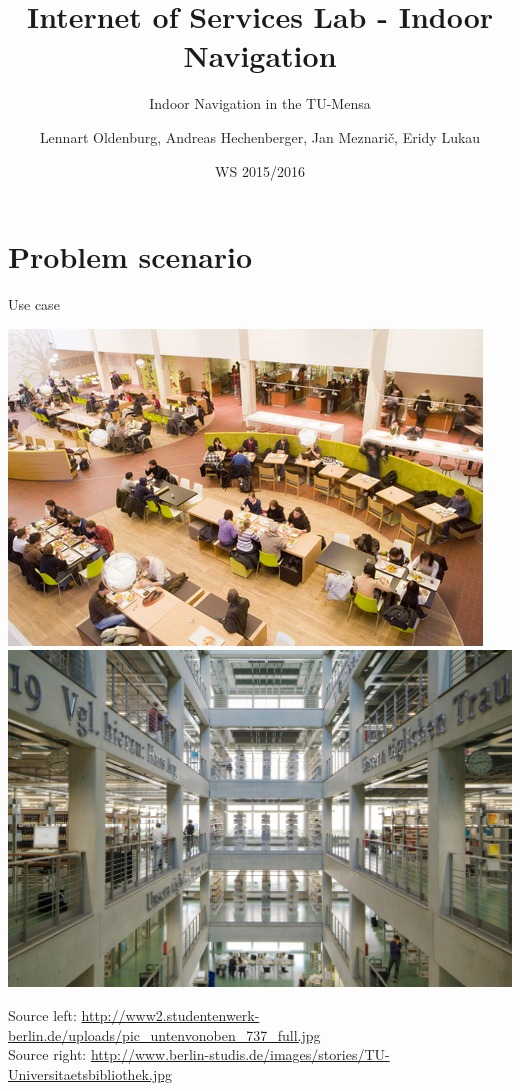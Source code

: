 \documentclass[11pt]{beamer}
\title{Internet of Services Lab - Indoor Navigation}
\subtitle{\small{Indoor Navigation in the TU-Mensa}}
\author[Oldenburg, Hechenberger, Meznarič, Lukau]{{Lennart Oldenburg, Andreas Hechenberger, Jan Meznarič, Eridy Lukau}}
\institute[TU Berlin]{Department of Telecommunication Systems Service-centric Networking
\\ Technische Universität Berlin}
\date[WS 2015/2016]{WS 2015/2016}
\newcounter{currentOutline}
\begin{document}
\begin{frame}[plain]
    \titlepage
\end{frame}





\section{Problem scenario}

\begin{frame}{Use case}

	\vspace{1cm}

    \begin{center}

        \includegraphics[width=.5\textwidth]{mensa}
        \includegraphics[width=.5\textwidth]{Bibliothek}

    \end{center}

	\vspace{1cm}

    \tiny{Source left: \url{http://www2.studentenwerk-berlin.de/uploads/pic_untenvonoben_737_full.jpg}}\\
    \tiny{Source right: \url{http://www.berlin-studis.de/images/stories/TU-Universitaetsbibliothek.jpg}}

\end{frame}
\end{document}
